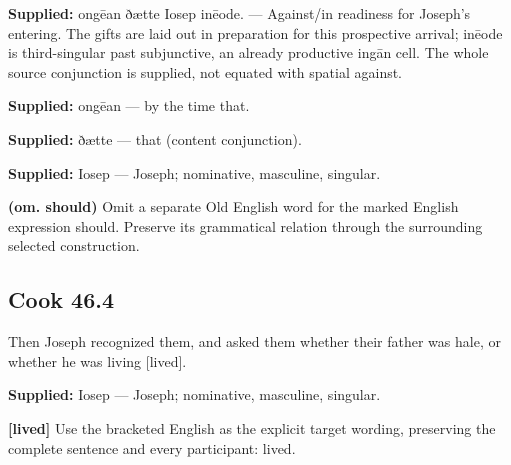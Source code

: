 \textbf{Supplied:} ongēan ðætte Iosep inēode. — Against/\allowbreak{}in readiness for Joseph’s entering. The gifts are laid out in preparation for this prospective arrival; inēode is third-singular past subjunctive, an already productive ingān cell. The whole source conjunction is supplied, not equated with spatial against.

\textbf{Supplied:} ongēan — by the time that.

\textbf{Supplied:} ðætte — that (content conjunction).

\textbf{Supplied:} Iosep — Joseph; nominative, masculine, singular.

\textbf{(om. should)} Omit a separate Old English word for the marked English expression should. Preserve its grammatical relation through the surrounding selected construction.

\par\begin{minipage}{\linewidth}\raggedright
\subsection*{Cook 46.4}

Then Joseph recognized them, and asked them whether their father was hale, or whether he was living [lived].

\textbf{Supplied:} Iosep — Joseph; nominative, masculine, singular.

\textbf{[lived]} Use the bracketed English as the explicit target wording, preserving the complete sentence and every participant: lived.

\end{minipage}\par\addvspace{4pt}

